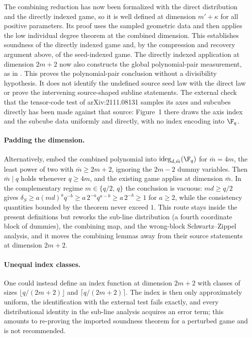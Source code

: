 \documentclass[11pt]{article}
\begin{document}
The combining reduction has now been formalized with the direct distribution
and the directly indexed game, so it is well defined at dimension
$m'+\kappa$ for
all positive parameters.  Its proof uses the sampled geometric data and then
applies the low individual degree theorem at the combined dimension.  This
establishes soundness of the directly indexed game and, by the compression
and recovery argument above, of the seed-indexed game. The directly indexed
application at dimension $2m+2$ now also constructs the global polynomial-pair
measurement, as  in
. This proves the polynomial-pair
conclusion without a divisibility hypothesis. It does not identify the
undefined source seed law with the direct law or prove the intervening
source-shaped subline statements.
The external check that the tensor-code test of arXiv:2111.08131 samples
its axes and subcubes directly has been made against that source: Figure~1
there draws the axis index and the subcube data uniformly and directly,
with no index encoding into $\F_q$.

\paragraph{Padding the dimension.}
Alternatively, embed the combined polynomial into
$\mathrm{ideg}_{d,\bar m}(\F_q)$ for $\bar m = 4m$, the least power of two
with $\bar m \ge 2m+2$, ignoring the $2m-2$ dummy variables.  Then
$\bar m \mid q$ holds whenever $q \ge 4m$, and the existing game applies at
dimension $\bar m$.  In the complementary regime $m \in \{q/2,\, q\}$ the
conclusion is vacuous: $md \ge q/2$ gives
$\delta_S \ge a(md)^a q^{-b} \ge a\,2^{-a} q^{a-b} \ge a\,2^{-b} \ge 1$
for $a \ge 2$, while the consistency quantities bounded by the theorem never
exceed $1$.  This route stays inside the present definitions but reworks the
sub-line distribution (a fourth coordinate block of dummies), the combining
map, and the wrong-block Schwartz--Zippel analysis, and it moves the
combining lemmas away from their source statements at dimension $2m+2$.

\paragraph{Unequal index classes.}
One could instead define an index function at dimension $2m+2$ with classes
of sizes $\lfloor q/(2m+2)\rfloor$ and $\lceil q/(2m+2)\rceil$.  The index
is then only approximately uniform, the identification with the external
test fails exactly, and every distributional identity in the sub-line
analysis acquires an error term; this amounts to re-proving the imported
soundness theorem for a perturbed game and is not recommended.
\end{document}
